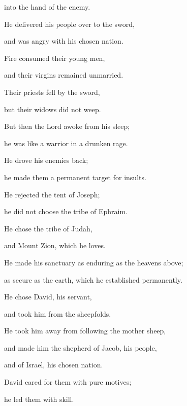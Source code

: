 {into the hand
of the enemy.
\par }{\Q {}He delivered
his people
over to the sword,
\par }{\Q and was angry
with his chosen nation.
\par }{\Q {}Fire
consumed
their young men,
\par }{\Q and their virgins
remained unmarried.
\par }{\Q {}Their priests
fell
by the sword,
\par }{\Q but their widows
did not
weep.
\par }{\Q {}But then
the Lord
awoke
from his sleep;
\par }{\Q he was like a warrior
in a drunken rage.
\par }{\Q {}He drove
his enemies
back;
\par }{\Q he made them a permanent
target
for insults.
\par }{\Q {}He rejected
the tent
of Joseph;
\par }{\Q he did not
choose
the tribe
of Ephraim.
\par }{\Q {}He chose
the tribe
of Judah,
\par }{\Q and Mount
Zion,
which
he loves.
\par }{\Q {}He made his sanctuary
as enduring
as the heavens above;

\par }{\Q as secure as the earth,
which he established
permanently.
\par }{\Q {}He chose
David,
his servant,
\par }{\Q and took
him from the sheepfolds.
\par }{\Q {}He took
him away from following
the mother sheep,
\par }{\Q and made him the shepherd
of Jacob,
his people,
\par }{\Q and of Israel,
his chosen nation.
\par }{\Q {}David cared for
them with pure motives;
\par }{\Q he led
them with skill.


}
